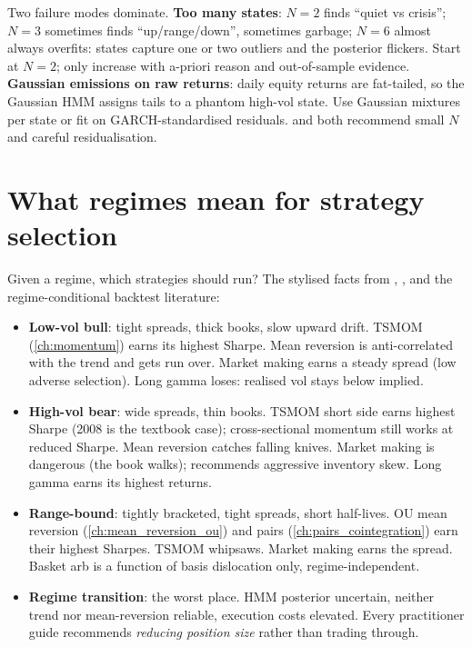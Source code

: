 \begin{pitfallbox}
Two failure modes dominate. \textbf{Too many states}: $N = 2$ finds
``quiet vs crisis''; $N = 3$ sometimes finds ``up/range/down'',
sometimes garbage; $N = 6$ almost always overfits: states
capture one or two outliers and the posterior flickers. Start at
$N = 2$; only increase with a-priori reason and out-of-sample
evidence. \textbf{Gaussian emissions on raw returns}: daily equity
returns are fat-tailed, so the Gaussian HMM assigns tails to a
phantom high-vol state. Use Gaussian mixtures per state or fit on
GARCH-standardised residuals. \citeChanQT{} and
\citep{quantstart2016hmm} both recommend small $N$ and careful
residualisation.
\end{pitfallbox}

\section{What regimes mean for strategy selection}
\label{sec:wsw_regime_map}

Given a regime, which strategies should run? The stylised facts
from \citeChan{}, \citeChanQT{}, and the regime-conditional
backtest literature:
\begin{itemize}
  \item \textbf{Low-vol bull}: tight spreads, thick books, slow
  upward drift. TSMOM (\cref{ch:momentum}) earns its highest
  Sharpe. Mean reversion is anti-correlated with the trend and
  gets run over. Market making earns a steady spread (low adverse
  selection). Long gamma loses: realised vol stays below implied.
  \item \textbf{High-vol bear}: wide spreads, thin books. TSMOM
  short side earns highest Sharpe (2008 is the textbook case);
  cross-sectional momentum still works at reduced Sharpe. Mean
  reversion catches falling knives. Market making is dangerous
  (the book walks); \citeChan{} recommends aggressive inventory
  skew. Long gamma earns its highest returns.
  \item \textbf{Range-bound}: tightly bracketed, tight spreads,
  short half-lives. OU mean reversion
  (\cref{ch:mean_reversion_ou}) and pairs
  (\cref{ch:pairs_cointegration}) earn their highest Sharpes.
  TSMOM whipsaws. Market making earns the spread. Basket arb is
  a function of basis dislocation only, regime-independent.
  \item \textbf{Regime transition}: the worst place. HMM
  posterior uncertain, neither trend nor mean-reversion reliable,
  execution costs elevated. Every practitioner guide recommends
  \emph{reducing position size} rather than trading through.
\end{itemize}

